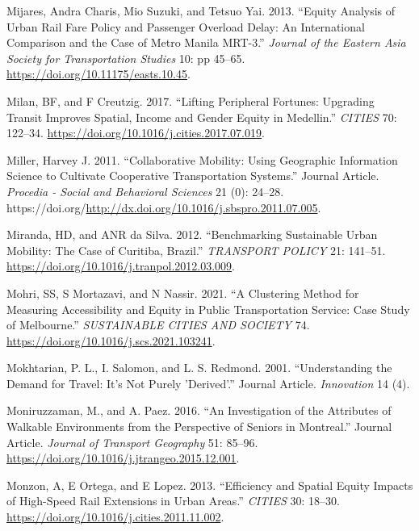 \documentclass[12pt, oneside]{report}
\newlength{\cslhangindent}
\newlength{\cslentryspacingunit} %
\newenvironment{CSLReferences}[2] %
 {%
  \setlength{\parindent}{0pt}
  \ifodd #1
  \let\oldpar\par
  \def\par{\hangindent=\cslhangindent\oldpar}
  \fi
  \setlength{\parskip}{#2\cslentryspacingunit}
 }%
 {}
\begin{document}
\begin{CSLReferences}{1}{0}
\leavevmode{}%
Mijares, Andra Charis, Mio Suzuki, and Tetsuo Yai. 2013. {``Equity
Analysis of Urban Rail Fare Policy and Passenger Overload Delay: An
International Comparison and the Case of Metro Manila {MRT}-3.''}
\emph{Journal of the Eastern Asia Society for Transportation Studies}
10: pp 45--65. \url{https://doi.org/10.11175/easts.10.45}.

\leavevmode{}%
Milan, BF, and F Creutzig. 2017. {``Lifting Peripheral Fortunes:
{Upgrading} Transit Improves Spatial, Income and Gender Equity in
{Medellin}.''} \emph{CITIES} 70: 122--34.
\url{https://doi.org/10.1016/j.cities.2017.07.019}.

\leavevmode{}%
Miller, Harvey J. 2011. {``Collaborative Mobility: Using Geographic
Information Science to Cultivate Cooperative Transportation Systems.''}
Journal Article. \emph{Procedia - Social and Behavioral Sciences} 21
(0): 24--28.
https://doi.org/\url{http://dx.doi.org/10.1016/j.sbspro.2011.07.005}.

\leavevmode{}%
Miranda, HD, and ANR da Silva. 2012. {``Benchmarking Sustainable Urban
Mobility: {The} Case of {Curitiba}, {Brazil}.''} \emph{TRANSPORT POLICY}
21: 141--51. \url{https://doi.org/10.1016/j.tranpol.2012.03.009}.

\leavevmode{}%
Mohri, SS, S Mortazavi, and N Nassir. 2021. {``A Clustering Method for
Measuring Accessibility and Equity in Public Transportation Service:
{Case} Study of {Melbourne}.''} \emph{SUSTAINABLE CITIES AND SOCIETY}
74. \url{https://doi.org/10.1016/j.scs.2021.103241}.

\leavevmode{}%
Mokhtarian, P. L., I. Salomon, and L. S. Redmond. 2001. {``Understanding
the Demand for Travel: It's Not Purely 'Derived'.''} Journal Article.
\emph{Innovation} 14 (4).

\leavevmode{}%
Moniruzzaman, M., and A. Paez. 2016. {``An Investigation of the
Attributes of Walkable Environments from the Perspective of Seniors in
Montreal.''} Journal Article. \emph{Journal of Transport Geography} 51:
85--96. \url{https://doi.org/10.1016/j.jtrangeo.2015.12.001}.

\leavevmode{}%
Monzon, A, E Ortega, and E Lopez. 2013. {``Efficiency and Spatial Equity
Impacts of High-Speed Rail Extensions in Urban Areas.''} \emph{CITIES}
30: 18--30. \url{https://doi.org/10.1016/j.cities.2011.11.002}.


\end{CSLReferences}
\end{document}
